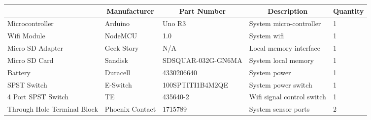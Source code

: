 \documentclass[12pt, titlepage]{article}
\begin{document}
\begin{table}[H]
  \centering
  \begin{tabular}{|p{3cm}|p{2cm}|p{4cm}|p{4cm}|p{2cm}|}
  \hline
  \rowcolor[gray]{0.9}
  \multicolumn{1}{|c|}{\textbf{Component}} & \multicolumn{1}{c|}{\textbf{Manufacturer}} & \multicolumn{1}{c|}{\textbf{Part Number}} & \multicolumn{1}{c|}{\textbf{Description}} & \multicolumn{1}{|c|}{\textbf{Quantity}}
  \\ \hline
  Microcontroller
  & Arduino
  & Uno R3
  & System micro-controller
  & 1
  \newline                                
  \\ \hline

  Wifi Module                              
  & NodeMCU
  & 1.0
  & System wifi 
  & 1
  \newline                                
  \\ \hline

  Micro SD Adapter                          
  & Geek Story
  & N/A
  & Local memory interface
  & 1
  \newline                                
  \\ \hline

  Micro SD Card                                
  & Sandisk
  & SDSQUAR-032G-GN6MA
  & System local memory
  & 1
  \newline                            
  \\ \hline

  Battery                                
  & Duracell
  & 4330206640
  & System power
  & 1
  \newline                            
  \\ \hline

  SPST Switch                                
  & E-Switch
  & 100SPTITI1B4M2QE
  & System power switch
  & 1
  \newline                            
  \\ \hline

  4 Port SPST Switch                                
  & TE
  & 435640-2
  & Wifi signal control switch
  & 1
  \newline                            
  \\ \hline

  Through Hole Terminal Block                                
  & Phoenix Contact
  & 1715789
  & System sensor ports
  & 2
  \newline                            
  \\ \hline


\end{tabular}
\end{table}
\end{document}
